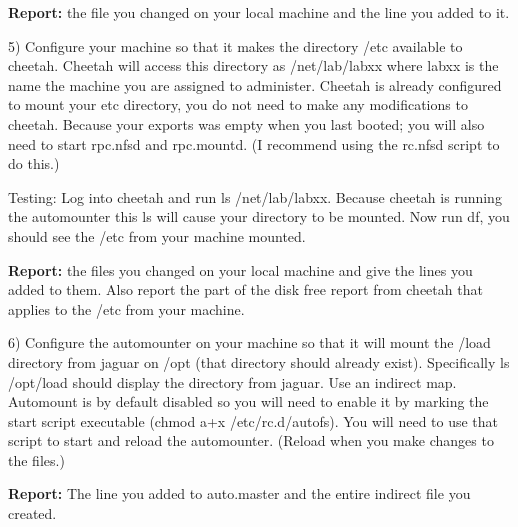 {\bf Report:} the file you changed on your local machine and the line
you added to it.

5) Configure your machine so that it makes the directory
{\ltt{}/etc} available to cheetah.
Cheetah will access this directory as {\ltt{}/net/lab/labxx} where {\ltt{}labxx}
is the name the machine you are assigned to administer.
Cheetah is already configured to mount your {\ltt{}etc} directory,
you do not need to make any modifications to cheetah.
Because your {\ltt{}exports} was empty when you last booted;
you will also need to start {\ltt{}rpc.nfsd} and {\ltt{}rpc.mountd}.
(I recommend using the {\ltt{}rc.nfsd} script to do this.)

Testing: Log into cheetah and run {\ltt{}ls /net/lab/labxx}.
Because cheetah is running the automounter
this {\ltt{}ls} will cause your directory to be mounted.
Now run {\ltt{}df}, you should see the {\ltt{}/etc} from your machine mounted.

{\bf Report:} the files you changed on your local machine and give the lines 
you added to them.
Also report the part of the disk free report from cheetah that applies to 
the {\ltt{}/etc} from your machine.

6) Configure the automounter on your machine so that it will mount the
{\ltt{}/load} directory from {\ltt{}jaguar} on {\ltt{}/opt} (that directory
should already exist). Specifically {\ltt{}ls /opt/load} should display
the directory from {\ltt{}jaguar}. Use an indirect map.
Automount is by default disabled so you will need to enable it by marking
the start script executable ({\ltt{}chmod a+x /etc/rc.d/autofs}).
You will need to use that script to start and reload the automounter.
(Reload when you make changes to the files.)

{\bf Report:} The line you added to {\ltt{}auto.master} and the entire
indirect file you created.
\bye
